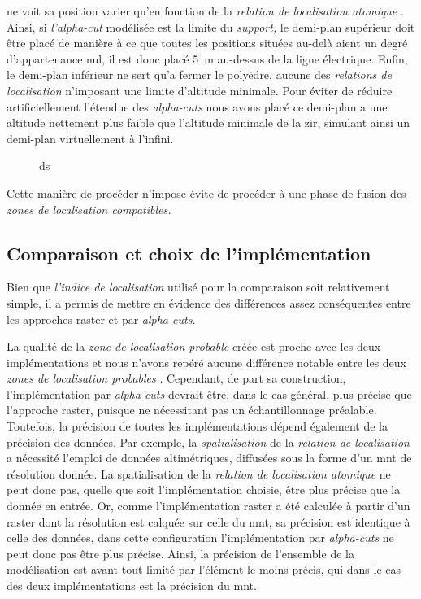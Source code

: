 ne voit sa position varier qu'en fonction de la \emph{relation de localisation atomique} . Ainsi, si \emph{l'alpha-cut} modélisée est la limite du \emph{support,} le demi-plan supérieur doit être placé de manière à ce que toutes les positions situées au-delà aient un degré d'appartenance nul, il est donc placé \SI{5}{\meter} au-dessus de la ligne électrique. 
Enfin, le demi-plan inférieur ne sert qu'a fermer le polyèdre, aucune des \emph{relations de localisation} n'imposant une limite d'altitude minimale. Pour éviter de réduire artificiellement l'étendue des \emph{alpha-cuts} nous avons placé ce demi-plan a une altitude nettement plus faible que l'altitude minimale de la zir, simulant ainsi un demi-plan virtuellement à l'infini.

\begin{figure}
  \centering
  
  \caption{ds}
  \label{fig:ds}
\end{figure}

Cette manière de procéder n'impose évite de procéder à une phase de
fusion des \emph{zones de localisation compatibles.}


\subsection{Comparaison et choix de l'implémentation}

Bien que \emph{l'indice de localisation} utilisé pour la comparaison
soit relativement simple, il a permis de mettre en évidence des
différences assez conséquentes entre les approches raster et par
\emph{alpha-cuts.}

La qualité de la \emph{zone de localisation probable} créée est proche
avec les deux implémentations et nous n'avons repéré aucune différence
notable entre les deux \emph{zones de localisation probables}
\autocite{Bunel2019a}. Cependant, de part sa construction,
l'implémentation par \emph{alpha-cuts} devrait être, dans le cas
général, plus précise que l'approche raster, puisque ne nécessitant
pas un échantillonnage préalable. Toutefois, la précision de toutes
les implémentations dépend également de la précision des données. Par
exemple, la \emph{spatialisation} de la \emph{relation de
  localisation}  a nécessité l'emploi de
données altimétriques, diffusées sous la forme d'un \ac{mnt} de
résolution donnée. La spatialisation de la \emph{relation de
  localisation atomique}
 ne peut
donc pas, quelle que soit l'implémentation choisie, être plus précise
que la donnée en entrée. Or, comme l'implémentation raster a été
calculée à partir d'un raster dont la résolution est calquée sur celle
du \ac{mnt}, sa précision est identique à celle des données, dans
cette configuration l'implémentation par \emph{alpha-cuts} ne peut
donc pas être plus précise. Ainsi, la précision de l'ensemble de la
modélisation est avant tout limité par l'élément le moins précis, qui
dans le cas des deux implémentations est la précision du \ac{mnt}.

